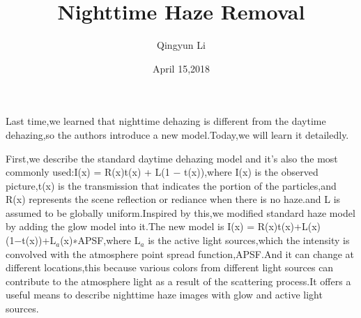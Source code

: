 \documentclass{article}
\author{Qingyun Li}
\date{April 15,2018}
\title{Nighttime Haze Removal}
\begin{document}
\maketitle
\par Last time,we learned that nighttime dehazing is different from the daytime dehazing,so the authors introduce a new model.Today,we will learn it detailedly.
\par First,we describe the standard daytime dehazing model and it's also the most commonly used:I(x) = R(x)t(x) + L(1 − t(x)),where I(x) is the observed picture,t(x) is the transmission that indicates the portion of the particles,and R(x) represents the scene reflection or rediance when there is no haze.and L is assumed to be globally uniform.Inspired by this,we modified standard haze model by adding the glow model into it.The new model is I(x) = R(x)t(x)+L(x)(1−t(x))+L$ _a $(x)∗APSF,where L$ _a $ is the active light sources,which the intensity is convolved with the atmosphere point spread function,APSF.And it can change at different locations,this because various colors from different light sources can contribute to the atmosphere light as a result of the scattering process.It offers a useful means to describe nighttime haze images with glow and active light sources.
\end{document}
